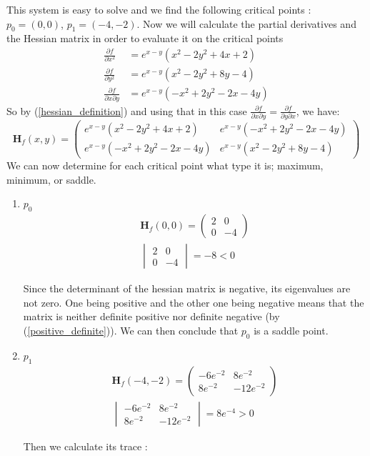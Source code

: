 \documentclass[../convex_optimization.tex]{subfiles}
\begin{document}
This system is easy to solve and we find  the following critical points :
$p_0 = (0, 0)$, $p_1 = (-4, -2)$.
Now we will calculate the partial derivatives and the Hessian matrix
in order to evaluate it on the critical points
\begin{align}
\frac{\partial f}{\partial x^2} &= e^{x-y} (x^2- 2y^2 + 4x + 2)\nonumber\\
\frac{\partial f}{\partial y^2} &=  e^{x-y} (x^2- 2y^2 + 8y - 4)\nonumber\\
\frac{\partial f}{\partial x \partial y } &= e^{x-y} (-x^2 +2y^2 - 2x - 4y)\nonumber
\end{align}
So by (\ref{hessian_definition}) and using that in this case
$\frac{\partial f}{\partial x \partial y }=\frac{\partial f}{\partial y \partial x }$, 
we have:
\begin{equation}
    \mathbf H_f(x,y) =\begin{pmatrix}
        e^{x-y} (x^2- 2y^2 + 4x + 2) &   e^{x-y} (-x^2 +2y^2 - 2x - 4y) \\
        e^{x-y} (-x^2 +2y^2 - 2x - 4y) & e^{x-y} (x^2- 2y^2 + 8y - 4)
    \end{pmatrix}
    \label{firsthessian}
\end{equation}
We can now determine for each critical point what type it is; maximum, minimum, or saddle.
\begin{enumerate}
\item $p_0$
    \begin{gather}
        \mathbf H_f(0,0) =
        \begin{pmatrix}
            2  & 0\\
            0 & -4
        \end{pmatrix}\nonumber\\
        \begin{vmatrix}
            2  & 0\\
            0 & -4
        \end{vmatrix} = - 8 < 0
        \nonumber
    \end{gather}

Since the determinant of the hessian matrix is negative,
its eigenvalues are not zero.
One being positive and the other one being negative means that the matrix
is neither definite positive nor definite negative
(by (\ref{positive_definite})).
We can then conclude that $p_0$ is a saddle point.
\item $p_1$
    \begin{gather}
        \mathbf H_f(-4,-2) =
        \begin{pmatrix}
            -6e^{ -2}  & 8e^{ -2}\\
            8e^{ -2} & -12e^{ -2}
        \end{pmatrix}\nonumber\\
        \begin{vmatrix}
            -6e^{ -2}  & 8e^{ -2}\\
            8e^{ -2} & -12e^{ -2}
        \end{vmatrix} =  8e^{ -4} > 0
        \nonumber
    \end{gather}

Then we calculate its trace :
\end{enumerate}
\end{document}
